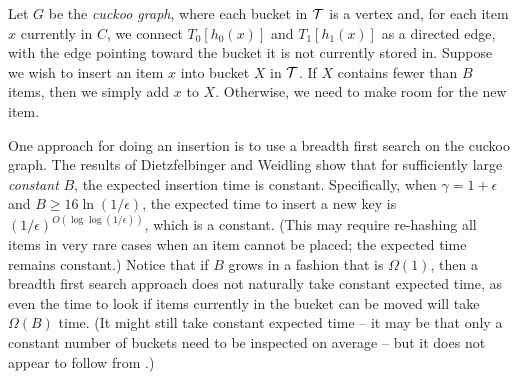 \documentclass[11pt,letterpaper]{article}
\begin{document}
Let $G$ be the \emph{cuckoo graph}, where each bucket in $\cal T$ is a
vertex and, for each item $x$ currently in $C$, we connect
$T_0[h_0(x)]$ and $T_1[h_1(x)]$ as a directed edge, with the edge
pointing toward the bucket it is not currently stored in.  Suppose we
wish to insert an item $x$ into bucket $X$ in $\cal T$.  If $X$
contains fewer than $B$ items, then we simply add $x$ to $X$.
Otherwise, we need to make room for the new item.  

One approach for doing an insertion is to use a breadth first search
on the cuckoo graph.  The results of Dietzfelbinger and Weidling show
that for sufficiently large {\em constant} $B$, the expected insertion
time is constant.  Specifically, when $\gamma = 1 + \epsilon$ and
$B \geq 16 \ln (1/\epsilon)$, the expected time to insert a new key is
$(1/\epsilon)^{O(\log \log (1/\epsilon))}$, which is a constant.
(This may require re-hashing all items in very rare cases when an
item cannot be placed; the expected time remains constant.) Notice
that if $B$ grows in a fashion that is $\Omega(1)$, then a breadth
first search approach does not naturally take constant expected time,
as even the time to look if items currently in the bucket can be moved
will take $\Omega(B)$ time.  (It might still take constant expected
time -- it may be that only a constant number of buckets need to be
inspected on average -- but it does not appear to follow
from \cite{dw-badtpcs-07}.)
\end{document}
